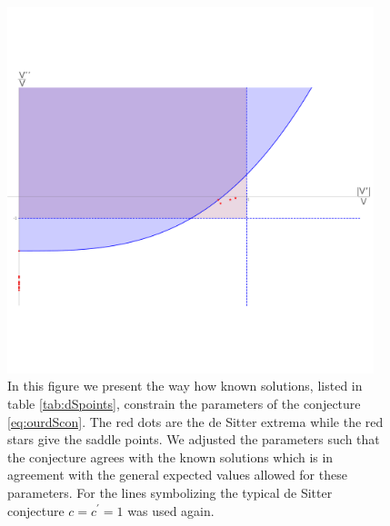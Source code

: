 \documentclass[a4paper,12pt]{report}
\begin{document}
\begin{figure}[htb]
     \centering
     \includegraphics[trim=0 210 0 170,clip,width=0.95\textwidth]{constpara_mod.pdf}
     \caption{In this figure we present the way how known solutions, listed in table \ref{tab:dSpoints}, constrain the parameters of the conjecture \eqref{eq:ourdScon}. The red dots are the de Sitter extrema while the red stars give the saddle points. We adjusted the parameters such that the conjecture agrees with the known solutions which is in agreement with the general expected values allowed for these parameters. For the lines symbolizing the typical de Sitter conjecture $c=c^ \prime = 1$ was used again.}
     \label{fig:constconj}
\end{figure}
\newpage
\end{document}
